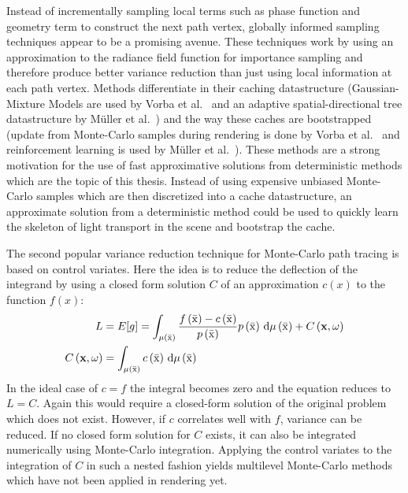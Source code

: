 Instead of incrementally sampling local terms such as phase function and geometry term to construct the next path vertex, globally informed sampling techniques appear to be a promising avenue. These techniques work by using an approximation to the radiance field function for importance sampling and therefore produce better variance reduction than just using local information at each path vertex. Methods differentiate in their caching datastructure (Gaussian-Mixture Models are used by Vorba et al.~\cite{Vorba14} and an adaptive spatial-directional tree datastructure by M\"{u}ller et al.~\cite{Mueller17}) and the way these caches are bootstrapped (update from Monte-Carlo samples during rendering is done by Vorba et al.~\cite{Vorba14} and reinforcement learning is used by M\"{u}ller et al.~\cite{Mueller17}). These methods are a strong motivation for the use of fast approximative solutions from deterministic methods which are the topic of this thesis. Instead of using expensive unbiased Monte-Carlo samples which are then discretized into a cache datastructure, an approximate solution from a deterministic method could be used to quickly learn the skeleton of light transport in the scene and bootstrap the cache.

The second popular variance reduction technique for Monte-Carlo path tracing is based on control variates. Here the idea is to reduce the deflection of the integrand by using a closed form solution $C$ of an approximation $c\left(x\right)$ to the function $f\left(x\right)$:
\begin{align}
L &= E[g] =
\int_{\mu\left(\bar{\mathrm{x}}\right)}
\frac{f\left(\bar{\mathrm{x}}\right)-c\left(\bar{\mathrm{x}}\right)}{p\left(\bar{\mathrm{x}}\right)}p\left(\bar{\mathrm{x}}\right)
\,\mathrm{d}\mu\left(\bar{\mathrm{x}}\right)
+C\left(\mathbf{x}, \omega\right)
\\
C\left(\mathbf{x}, \omega\right) &= 
\int_{\mu\left(\bar{\mathrm{x}}\right)}
c\left(\bar{\mathrm{x}}\right)
\,\mathrm{d}\mu\left(\bar{\mathrm{x}}\right)
\end{align}
In the ideal case of $c=f$ the integral becomes zero and the equation reduces to $L=C$. Again this would require a closed-form solution of the original problem which does not exist. However, if $c$ correlates well with $f$, variance can be reduced. If no closed form solution for $C$ exists, it can also be integrated numerically using Monte-Carlo integration. Applying the control variates to the integration of $C$ in such a nested fashion yields multilevel Monte-Carlo methods which have not been applied in rendering yet. 

